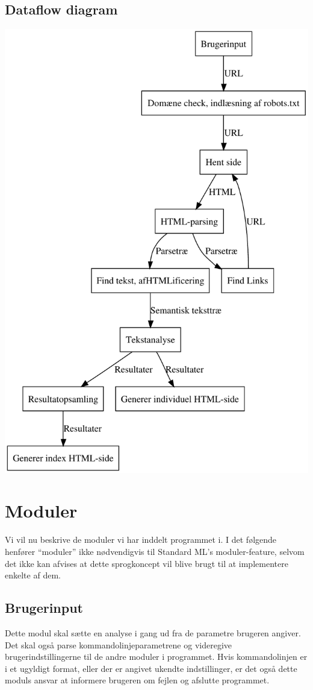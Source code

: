\documentclass[a4paper,oneside,article, titlepage]{memoir}
\begin{document}
\section{Dataflow diagram}
\includegraphics{designill.pdf}


\chapter{Moduler}
Vi vil nu beskrive de moduler vi har inddelt programmet i. I det
følgende henfører ``moduler'' ikke nødvendigvis til Standard ML's
moduler-feature, selvom det ikke kan afvises at dette sprogkoncept vil
blive brugt til at implementere enkelte af dem.

\section{Brugerinput}
Dette modul skal sætte en analyse i gang ud fra de parametre brugeren
angiver. Det skal også parse kommandolinjeparametrene og videregive
brugerindstillingerne til de andre moduler i programmet. Hvis
kommandolinjen er i et ugyldigt format, eller der er angivet ukendte
indstillinger, er det også dette moduls ansvar at informere brugeren
om fejlen og afslutte programmet.
\end{document}
